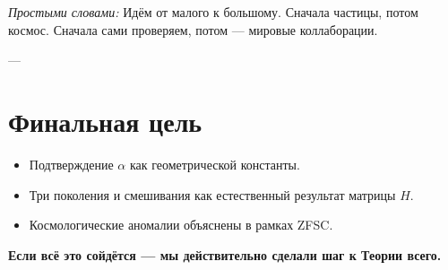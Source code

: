 \documentclass[a4paper,12pt]{article}
\begin{document}
\textit{Простыми словами:}  
Идём от малого к большому. Сначала частицы, потом космос.  
Сначала сами проверяем, потом — мировые коллаборации.

---

\section*{Финальная цель}
\begin{itemize}
  \item Подтверждение $\alpha$ как геометрической константы.  
  \item Три поколения и смешивания как естественный результат матрицы $H$.  
  \item Космологические аномалии объяснены в рамках ZFSC.  
\end{itemize}

\textbf{Если всё это сойдётся — мы действительно сделали шаг к Теории всего.}
\end{document}
